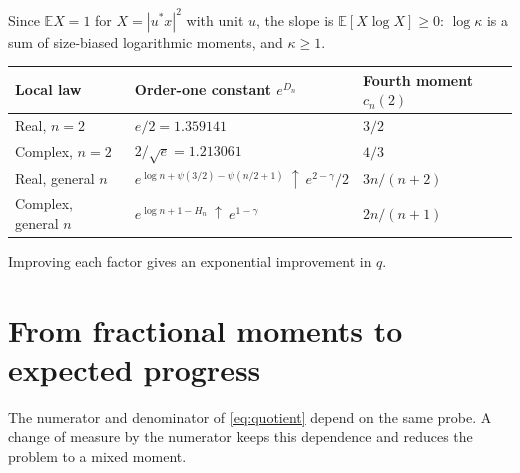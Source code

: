 \documentclass[11pt,a4paper]{article}
\theoremstyle{definition}\newtheorem{definition}[theorem]{Definition}
\theoremstyle{remark}\newtheorem{remark}[theorem]{Remark}
\numberwithin{equation}{section}
\newcommand{\E}{\mathbb E}
\begin{document}
Since $\E X=1$ for $X=|u^*x|^2$ with unit $u$, the slope is $\E[X\log X]\ge0$: $\log\kappa$
is a sum of size-biased logarithmic moments, and $\kappa\ge1$.

\begin{center}
\renewcommand{\arraystretch}{1.15}
\begin{tabular}{@{}lll@{}}
\toprule
Local law & Order-one constant $e^{D_n}$ & Fourth moment $c_n(2)$\\
\midrule
Real, $n=2$ & $e/2=1.359141$ & $3/2$\\
Complex, $n=2$ & $2/\sqrt e=1.213061$ & $4/3$\\
Real, general $n$ & $e^{\log n+\psi(3/2)-\psi(n/2+1)}\ \uparrow\ e^{2-\gamma}/2$ & $3n/(n+2)$\\
Complex, general $n$ & $e^{\log n+1-H_n}\ \uparrow\ e^{1-\gamma}$ & $2n/(n+1)$\\
\bottomrule
\end{tabular}
\end{center}
Improving each factor gives an exponential improvement in $q$.

\section{From fractional moments to expected progress}\label{sec:drift}
The numerator and denominator of \eqref{eq:quotient} depend on the same probe.
A change of measure by the numerator keeps this dependence and reduces the
problem to a mixed moment.
\end{document}
